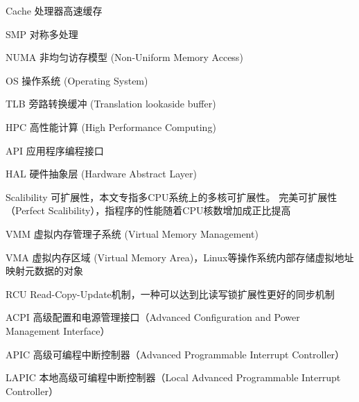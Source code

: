\begin{denotation}

\item[Cache] 处理器高速缓存
\item[SMP] 对称多处理
\item[NUMA] 非均匀访存模型 (Non-Uniform Memory Access)
\item[OS] 操作系统 (Operating System)
\item[TLB] 旁路转换缓冲 (Translation lookaside buffer)
\item[HPC] 高性能计算 (High Performance Computing)
\item[API] 应用程序编程接口
\item[HAL] 硬件抽象层 (Hardware Abstract Layer)
\item[Scalibility] 可扩展性，本文专指多CPU系统上的多核可扩展性。
	完美可扩展性（Perfect Scalibility），指程序的性能随着CPU核数增加成正比提高
\item[VMM] 虚拟内存管理子系统 (Virtual Memory Management)
\item[VMA] 虚拟内存区域 (Virtual Memory
	Area)，Linux等操作系统内部存储虚拟地址映射元数据的对象
\item[RCU]
	Read-Copy-Update机制，一种可以达到比读写锁扩展性更好的同步机制
\item[ACPI] 高级配置和电源管理接口（Advanced Configuration and Power Management Interface）
\item[APIC] 高级可编程中断控制器（Advanced Programmable Interrupt Controller）
\item[LAPIC] 本地高级可编程中断控制器（Local Advanced Programmable Interrupt Controller）
\end{denotation}

